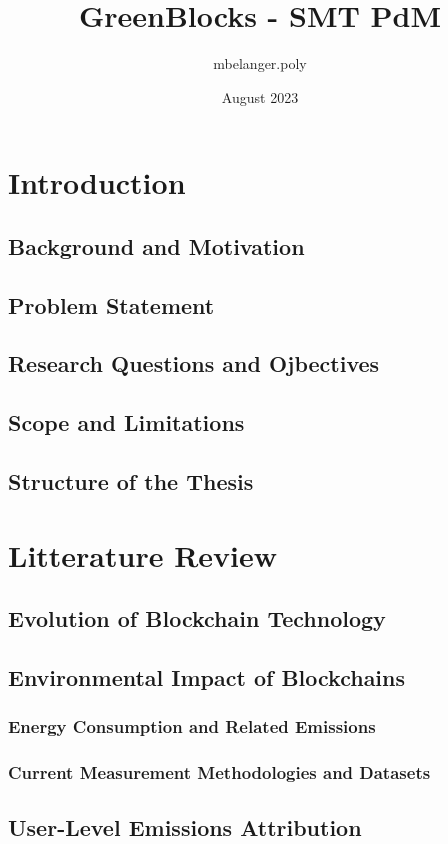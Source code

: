\documentclass[12pt]{article}
\title{GreenBlocks - SMT PdM}
\author{mbelanger.poly}
\date{August 2023}
\begin{document}


\tableofcontents

\section{Introduction}
\blindtext
\cite{nakamoto_bitcoin_2008}
\cite{aysan_blockchain-based_2021}
\cite{de_vries_revisiting_2022}




\subsection{Background and Motivation}
\blindtext
\subsection{Problem Statement}
\subsection{Research Questions and Ojbectives}
\subsection{Scope and Limitations}
\subsection{Structure of the Thesis}


\section{Litterature Review}
\subsection{Evolution of Blockchain Technology}
\subsection{Environmental Impact of Blockchains}
\subsubsection{Energy Consumption and Related Emissions}
\subsubsection{Current Measurement Methodologies and Datasets}
\subsection{User-Level Emissions Attribution}
\end{document}
